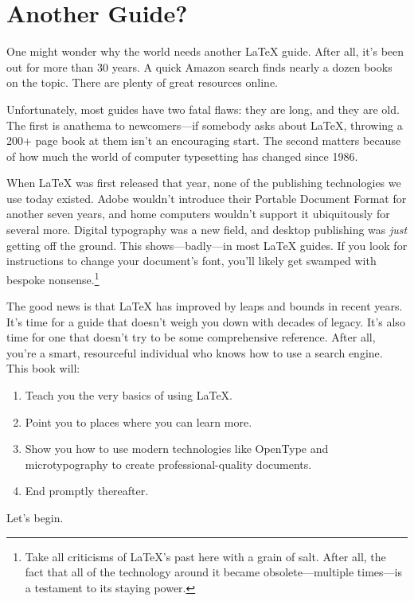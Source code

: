 \chapter{Another Guide?}

One might wonder why the world needs another \LaTeX{} guide.
After all, it's been out for more than 30 years.
A quick Amazon search finds nearly a dozen books on the topic.
There are plenty of great resources online.

Unfortunately, most guides have two fatal flaws: they are long,
and they are old.
The first is anathema to newcomers---if somebody asks about \LaTeX{},
throwing a 200+ page book at them isn't an encouraging start.
The second matters because of how much the world of computer typesetting has
changed since 1986.

When \LaTeX{} was first released that year, none of the publishing technologies
we use today existed.
Adobe wouldn't introduce their Portable Document Format for another seven years,
and home computers wouldn't support it ubiquitously for several more.
Digital typography was a new field, and desktop publishing was \emph{just}
getting off the ground.\punckern{}
This shows---badly---in most \LaTeX{} guides.
If you look for instructions to change your document's font,
you'll likely get swamped with bespoke nonsense.\punckern\footnote{%
Take all criticisms of \LaTeX's past here with a grain of
salt. After all, the fact that all of the technology around it became
obsolete---multiple times---is a testament to its staying power.}

The good news is that  \LaTeX{} has improved by leaps and bounds in recent years.
It's time for a guide that doesn't weigh you down with decades of legacy.
It's also time for one that doesn't try to be some comprehensive reference.
After all, you're a smart, resourceful individual who knows how to use a search
engine.
This book will:
\begin{enumerate}
\item Teach you the very basics of using \LaTeX.
\item Point you to places where you can learn more.
\item Show you how to use modern technologies like OpenType and microtypography
    to create professional-quality documents.
\item End promptly thereafter.
\end{enumerate}
Let's begin.
